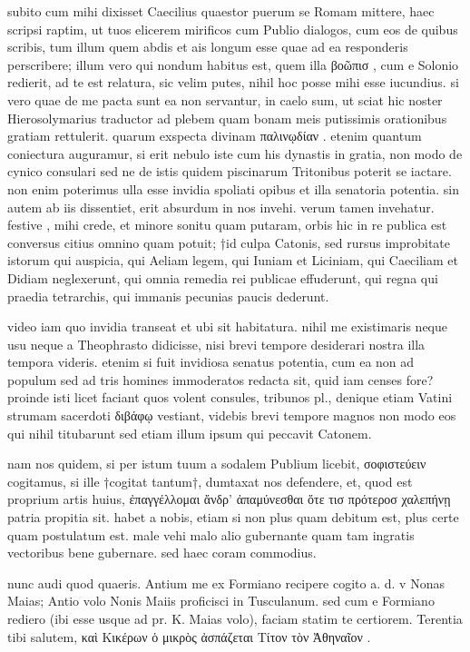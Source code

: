 


 subito cum mihi dixisset Caecilius quaestor puerum se Romam mittere, haec scripsi raptim, ut tuos elicerem mirificos cum Publio dialogos, cum eos de quibus scribis, tum illum quem abdis et ais longum esse quae ad ea responderis perscribere; illum vero qui nondum habitus est, quem illa βοῶπισ , cum e Solonio redierit, ad te est relatura, sic velim putes, nihil hoc posse mihi esse iucundius. si vero quae de me pacta sunt ea non servantur, in caelo sum, ut sciat hic noster Hierosolymarius traductor ad plebem quam bonam meis putissimis orationibus gratiam rettulerit. quarum exspecta divinam παλινῳδίαν . etenim quantum coniectura auguramur, si erit nebulo iste cum his dynastis in gratia, non modo de cynico consulari sed ne de istis quidem piscinarum Tritonibus poterit se iactare. non enim poterimus ulla esse invidia spoliati opibus et illa senatoria potentia. sin autem ab iis dissentiet, erit absurdum in nos invehi. verum tamen invehatur. festive , mihi crede, et minore sonitu quam putaram, orbis hic in re publica est conversus citius omnino quam potuit; †id culpa Catonis, sed rursus improbitate istorum qui auspicia, qui Aeliam legem, qui Iuniam et Liciniam, qui Caeciliam et Didiam neglexerunt, qui omnia remedia rei publicae effuderunt, qui regna qui praedia tetrarchis, qui immanis pecunias paucis dederunt.

 video iam quo invidia transeat et ubi sit habitatura. nihil me existimaris neque usu neque a Theophrasto didicisse, nisi brevi tempore desiderari nostra illa tempora videris. etenim si fuit invidiosa senatus potentia, cum ea non ad populum sed ad tris homines immoderatos redacta sit, quid iam censes fore? proinde isti licet faciant quos volent consules, tribunos pl., denique etiam Vatini strumam sacerdoti διβάφῳ vestiant, videbis brevi tempore magnos non modo eos qui nihil titubarunt sed etiam illum ipsum qui peccavit Catonem.

 nam nos quidem, si per istum tuum a sodalem Publium licebit, σοφιστεύειν cogitamus, si ille †cogitat tantum†, dumtaxat nos defendere, et, quod est proprium artis huius, ἐπαγγέλλομαι ἄνδρ' ἀπαμύνεσθαι ὅτε τισ πρότεροσ χαλεπήνῃ patria propitia sit. habet a nobis, etiam si non plus quam debitum est, plus certe quam postulatum est. male vehi malo alio gubernante quam tam ingratis vectoribus bene gubernare. sed haec coram commodius.

 nunc audi quod quaeris. Antium me ex Formiano recipere cogito a. d. v Nonas Maias; Antio volo Nonis Maiis proficisci in Tusculanum. sed cum e Formiano rediero (ibi esse usque ad pr. K. Maias volo), faciam statim te certiorem. Terentia tibi salutem, καὶ Κικέρων ὁ μικρὸς ἀσπάζεται Τίτον τὸν Ἀθηναῖον .
